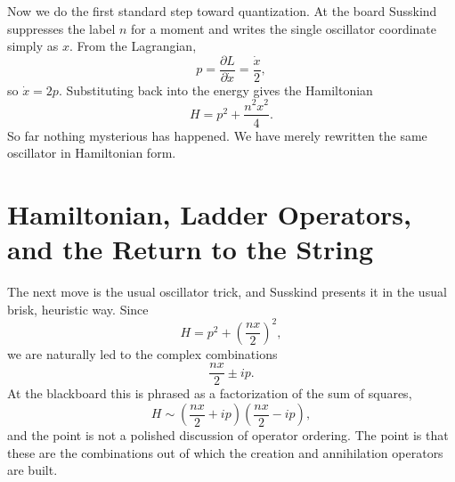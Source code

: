 Now we do the first standard step toward quantization. At the board Susskind suppresses the label \(n\) for a moment and writes the single oscillator coordinate simply as \(x\). From the Lagrangian,
\begin{equation}
p=\frac{\partial L}{\partial \dot x}=\frac{\dot x}{2},
\end{equation}
so \(\dot x=2p\). Substituting back into the energy gives the Hamiltonian
\begin{equation}
H=p^2+\frac{n^2x^2}{4}.
\end{equation}
So far nothing mysterious has happened. We have merely rewritten the same oscillator in Hamiltonian form.

\section{Hamiltonian, Ladder Operators, and the Return to the String}

The next move is the usual oscillator trick, and Susskind presents it in the usual brisk, heuristic way. Since
\begin{equation}
H=p^2+\left(\frac{nx}{2}\right)^2,
\end{equation}
we are naturally led to the complex combinations
\begin{equation}
\frac{nx}{2}\pm ip.
\end{equation}
At the blackboard this is phrased as a factorization of the sum of squares,
\begin{equation}
H \sim \left(\frac{nx}{2}+ip\right)\left(\frac{nx}{2}-ip\right),
\end{equation}
and the point is not a polished discussion of operator ordering. The point is that these are the combinations out of which the creation and annihilation operators are built.

